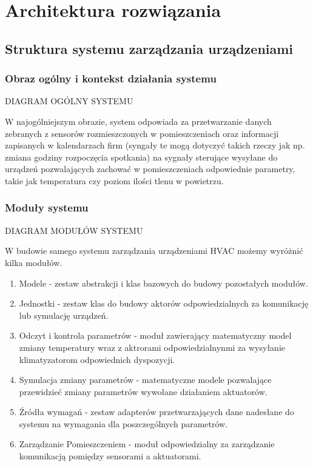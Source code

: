 \chapter{Architektura rozwiązania}
\section{Struktura systemu zarządzania urządzeniami}
\subsection{Obraz ogólny i kontekst działania systemu}
DIAGRAM OGÓLNY SYSTEMU
% 

W najogólniejszym obrazie, system odpowiada za przetwarzanie danych zebranych z sensorów rozmieszczonych w pomieszczeniach oraz informacji zapisanych w kalendarzach firm (syngały te mogą dotyczyć takich rzeczy jak np. zmiana godziny rozpoczęcia spotkania) na sygnały sterujące wysyłane do urządzeń pozwalających zachować w pomieszczeniach odpowiednie parametry, takie jak temperatura czy poziom ilości tlenu w powietrzu.

\subsection{Moduły systemu}
DIAGRAM MODUŁÓW SYSTEMU
% 

W budowie samego systemu zarządzania urządzeniami HVAC możemy wyróżnić kilka modułów.
\begin{enumerate}
    \item Modele - zestaw abstrakcji i klas bazowych do budowy pozostałych modułów.  
    \item Jednostki - zestaw klas do budowy aktorów odpowiedzialnych za komunikację lub symulację urządzeń.
    \item Odczyt i kontrola parametrów - moduł zawierający matematyczny model zmiany temperatury wraz z aktrorami odpowiedzialnynmi za wysyłanie klimatyzatorom odpowiednich dyspozycji.
    \item Symulacja zmiany parametrów - matematyczne modele pozwalające przewidzieć zmiany parametrów wywołane działaniem aktuatorów.
    \item Źródła wymagań - zestaw adapterów przetwarzających dane nadesłane do systemu na wymagania dla poszczególnych parametrów. 
    \item Zarządzanie Pomieszczeniem - moduł odpowiedzialny za zarządzanie komunikacją pomiędzy sensorami a aktuatorami. 
\end{enumerate}

